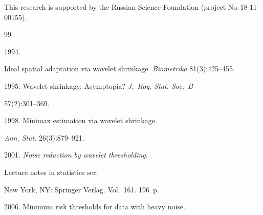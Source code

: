 \Ack



\vspace*{-3pt}





\noindent

This research is supported by the Russian Science Foundation (project No.\,18-11-00155).





\renewcommand{\bibname}{\protect\rmfamily References}




{\small\frenchspacing

{%


\begin{thebibliography}{99}




 1994. 

Ideal spatial adaptation via wavelet shrinkage. \textit{Biometrika} 81(3):425--455.





1995. Wavelet shrinkage: Asymptopia? \textit{J.~Roy. Stat. Soc.~B} 

57(2):301--369.




 1998. Minimax estimation via wavelet shrinkage. 

\textit{Ann. Stat.} 26(3):879--921.




 2001. \textit{Noise reduction by wavelet thresholding}. 

{Lecture notes in statistics ser}.

New York, NY: Springer Verlag.  Vol.~161. 196~p.




 2006. Minimum risk thresholds for data with heavy noise. 


\end{thebibliography}}}
